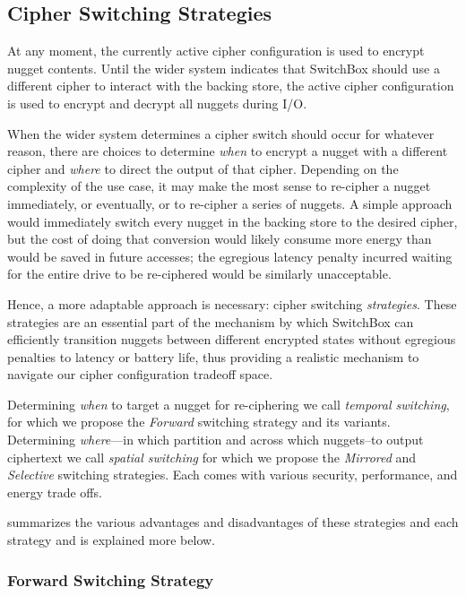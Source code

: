 \subsection{Cipher Switching Strategies}

At any moment, the currently active cipher configuration is used to encrypt
nugget contents. Until the wider system indicates that SwitchBox should use a
different cipher to interact with the backing store, the active cipher
configuration is used to encrypt and decrypt all nuggets during I/O.

When the wider system determines a cipher switch should occur for whatever
reason, there are choices to determine \emph{when} to encrypt a nugget
with a different cipher and \emph{where} to direct the output of that cipher.
Depending on the complexity of the use case, it may make the most sense to
re-cipher a nugget immediately, or eventually, or to re-cipher a series of
nuggets. A simple approach would immediately switch every nugget in the backing
store to the desired cipher, but the cost of doing that conversion would likely
consume more energy than would be saved in future accesses; the egregious
latency penalty incurred waiting for the entire drive to be re-ciphered would be
similarly unacceptable.

Hence, a more adaptable approach is necessary: cipher switching
\emph{strategies}. These strategies are an essential part of the mechanism by
which SwitchBox can efficiently transition nuggets between different encrypted
states without egregious penalties to latency or battery life, thus providing a
realistic mechanism to navigate our cipher configuration tradeoff space.

Determining \emph{when} to target a nugget for re-ciphering we call
\emph{temporal switching}, for which we propose the \emph{Forward} switching
strategy and its variants. Determining \emph{where}---in which partition and
across which nuggets--to output ciphertext we call \emph{spatial switching} for
which we propose the \emph{Mirrored} and \emph{Selective} switching strategies.
Each comes with various security, performance, and energy trade offs.

 summarizes the various advantages and
disadvantages of these strategies and each strategy and is explained more below.

\subsubsection{Forward Switching Strategy}

